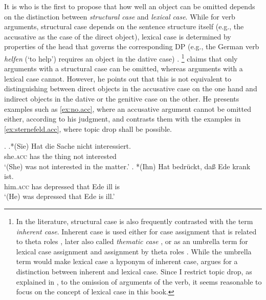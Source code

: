 It is \citet{sternefeld1985} who is the first to propose that how well an object can be omitted depends on the distinction between \textit{structural case}  and \textit{lexical case}.
While for verb arguments,  structural case  depends on the sentence structure itself (e.g., the accusative as the case of the direct object), lexical case is determined by properties of the head that governs the corresponding DP (e.g., the German verb \textit{helfen} (`to help') requires an object in the dative case)  \citep[see, e.g.,][]{haspelmath2009}.%
\footnote{In the literature, structural case  is also frequently contrasted with the term \textit{inherent case}. 
Inherent case is used either for case assignment that is related to theta roles \citep[171]{chomsky1981}, later also called \textit{thematic case} \citep[e.g.,][]{reinhart.siloni2005}, or as an umbrella term for lexical case assignment and assignment by theta roles \citep{haspelmath2009}.
While the umbrella term would make lexical case a hyponym of inherent case, \citet{woolford2006} argues for a distinction between inherent and lexical case.
Since I restrict topic drop, as explained in , to the omission of arguments of the verb, it seems reasonable to focus on the concept of lexical case in this book.
}
\citet{sternefeld1985} claims that only arguments  with a structural case  can be omitted, whereas arguments with a lexical case cannot.
However, he points out that this is not equivalent to distinguishing between direct objects in the accusative case  on the one hand and indirect objects in the dative  or the genitive  case on the other.
He presents examples such as \ref{ex:no.acc}, where an accusative argument  cannot be omitted either, according to his judgment, and contrasts them with the examples in \ref{ex:sternefeld.acc}, where topic drop shall be possible.

\ex.\label{ex:no.acc}
\ag.*(Sie) Hat die Sache nicht interessiert.\\
she.\textsc{acc} has the thing not interested\\
`(She) was not interested in the matter.'
\bg. *(Ihn) Hat bedrückt, daß Ede krank ist.\\
him.\textsc{acc} has depressed that Ede ill is\\
`(He) was depressed that Ede is ill.' \citep[][407, adapted, his judgments]{sternefeld1985}

